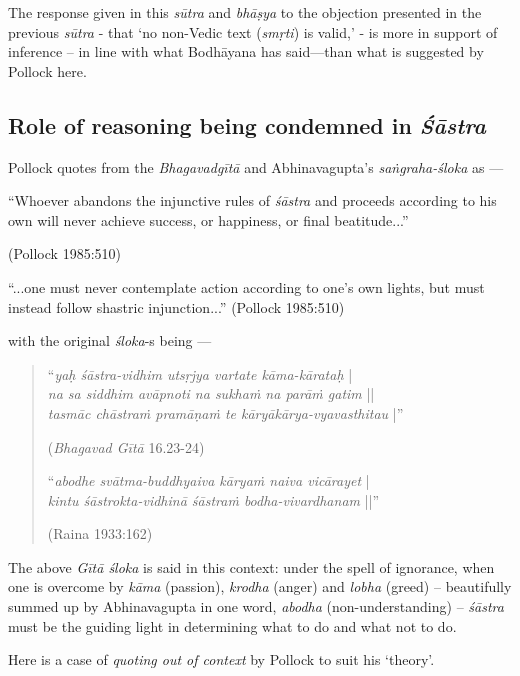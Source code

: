 The response given in this {\sl sūtra} and {\sl bhāṣya} to the objection presented in the previous {\sl sūtra} - that `no non-Vedic text ({\sl smṛti}) is valid,' - is more in support of inference -- in line with what Bodhāyana has said---than what is suggested by Pollock here.\\[-18pt]

\subsection{Role of reasoning being condemned in {{\sl\bfseries Śāstra}\relax}}\label{art12-sec3.7}

Pollock quotes from the {\sl Bhagavadgītā} and Abhinavagupta's {\sl saṅ\-graha-śloka} as ---
\begin{myquote}
``Whoever abandons the injunctive rules of {\sl śāstra} and proceeds according to his own will never achieve success, or happiness, or ﬁnal beatitude...”

\hfill (Pollock 1985:510)

``...one must never contemplate action according to one's own lights, but must instead follow shastric injunction...'' (Pollock 1985:510)
\end{myquote}
with the original {\sl śloka}-s being ---
\begin{quote}
``{{\sl yaḥ śāstra-vidhim utsṛjya vartate kāma-kārataḥ}} |\\ 
{\sl na sa siddhim avāpnoti na sukhaṁ na parāṁ gatim} ||\\
{\sl tasmāc chāstraṁ pramāṇaṁ te kāryākārya-vyavasthitau} |'' 

\hfill ({\sl Bhagavad Gītā} 16.23-24)

``{\sl abodhe svātma-buddhyaiva kāryaṁ naiva vicārayet} |\\
{\sl kintu śāstrokta-vidhinā śāstraṁ bodha-vivardhanam} ||'' 

\hfill (Raina 1933:162)
\end{quote}

The above {\sl Gītā śloka} is said in this context: under the spell of ignorance, when one is overcome by {\sl kāma} (passion), {\sl krodha} (anger) and {\sl lobha} (greed) -- beautifully summed up by Abhinavagupta in one word, {\sl abodha} (non-understanding) -- {\sl śāstra} must be the guiding light in determining what to do and what not to do. 

Here is a case of {\sl quoting out of context} by Pollock to suit his `theory'.

